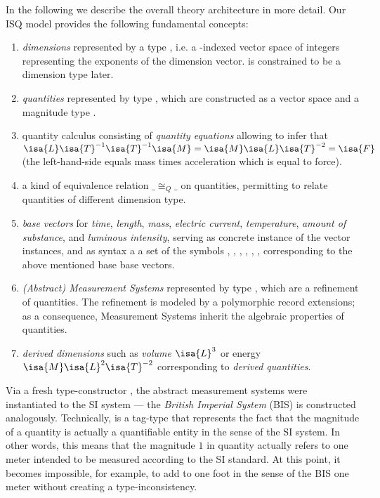 \documentclass[11pt,a4paper]{book}
\begin{document}
In the following we describe the overall theory architecture in more detail.
Our ISQ model provides the following fundamental concepts:
%
\begin{enumerate}%
\item \emph{dimensions} represented by a type  , i.e. a -indexed
      vector space of integers representing the exponents of the dimension vector. 
       is constrained to be a dimension type later.


\item \emph{quantities} represented by type , which are constructed as 
      a  vector space and a magnitude type . 

\item{quantity calculus} consisting of \emph{quantity equations} allowing to infer that 
      $\isa{L}\isa{T}^{-1}\isa{T}^{-1}\isa{M} = \isa{M}\isa{L}\isa{T}^{-2} = \isa{F} $ 
      (the left-hand-side equals mass times acceleration which is equal to force). 

\item a kind of equivalence relation $\_\cong_{Q}\_$ on quantities, permitting to relate
      quantities of different dimension type.


\item \emph{base vectors} for
      \emph{time}, \emph{length}, \emph{mass}, \emph{electric current},
      \emph{temperature}, \emph{amount of substance}, and \emph{luminous intensity}, 
      serving as concrete instance of the vector instances, and as syntax a
      a set of the symbols  , , , ,  
      \isa{{\isasymTheta}}, ,   corresponding to the above mentioned base 
      base vectors.

\item \emph{(Abstract) Measurement Systems} represented by type 
      , which are a refinement
      of quantities. The refinement is modeled by a polymorphic record extensions; as a 
      consequence, Measurement Systems inherit the algebraic properties of quantities.
 

\item \emph{derived dimensions} such as \emph{volume} $\isa{L}^3$ or energy 
      $\isa{M}\isa{L}^2\isa{T}^{-2}$ corresponding to \emph{derived quantities}.

\end{enumerate}

Via a fresh type-constructor , the abstract measurement systems were instantiated
to the SI system --- the \emph{British Imperial System} (BIS) is constructed analogously.
Technically,  is a tag-type that represents the fact that the magnitude of a quantity is
actually a quantifiable entity in the sense of the SI system. In other words, this means that the 
magnitude $1$ in quantity  actually refers to one meter intended to be measured 
according to the SI standard. At this point, it becomes impossible, for example, to add to one 
foot in the sense of the BIS one meter without creating a type-inconsistency.
\end{document}

